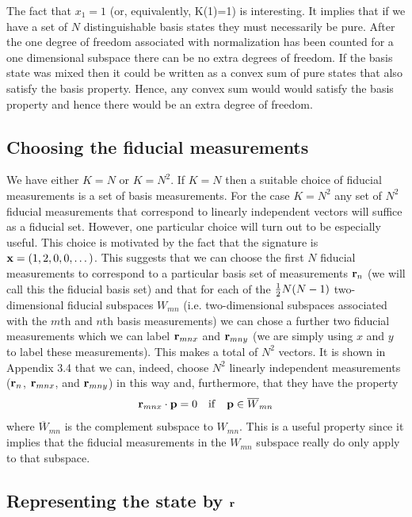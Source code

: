 \documentclass[12pt]{article}
\begin{document}
The fact that $x_1=1$ (or, equivalently, K(1)=1) is interesting.  It
implies that if we have a
set of $N$ distinguishable basis states they must necessarily be pure.
After the one degree of freedom associated with normalization has been
counted for a one
dimensional subspace there can be no extra degrees of freedom. If the
basis state was mixed then it could be written as a convex sum of pure
states that also satisfy the basis property. Hence, any convex sum would
would satisfy the basis property and hence there would be an extra
degree of freedom.

\subsection{Choosing the fiducial measurements}\label{choosing}

We have either $K=N$ or $K=N^2$. If $K=N$ then a suitable choice of
fiducial measurements is a set of basis measurements. For the case
$K=N^2$ any set of $N^2$ fiducial measurements that correspond to linearly
independent vectors will suffice as a fiducial set.  However, one
particular choice will turn out to be especially useful.  This choice
is motivated by the fact that the signature is
${\bf x}=(1,2,0,0,\dots)$.
This suggests that we can choose the first $N$ fiducial measurements to
correspond to a particular basis set of measurements ${\bf r}_n$ (we
will call this the fiducial basis set) and that for
each of the ${1\over2}N(N-1)$ two-dimensional fiducial subspaces
$W_{mn}$ (i.e.
two-dimensional subspaces associated with the $m$th and $n$th basis
measurements) we can chose a further two fiducial measurements which we can
label ${\bf r}_{mnx}$ and ${\bf r}_{mny}$ (we are simply using $x$ and
$y$ to label these measurements). This makes a total of $N^2$ vectors.
It is shown in Appendix 3.4 that we can, indeed, choose $N^2$ linearly
independent measurements
(${\bf r}_n$, ${\bf r}_{mnx}$, and ${\bf r}_{mny}$)
in this way and, furthermore, that they have the property
\begin{equation}\label{nooverlap}
{\bf r}_{mnx} \cdot {\bf p} = 0 ~~~{\rm if}~~~ {\bf p}\in \overline{W}_{mn}
\end{equation}
where $\overline{W}_{mn}$ is the complement subspace to $W_{mn}$.
This is a useful property since it implies that the fiducial measurements
in the $W_{mn}$ subspace really do only apply to that subspace.




\subsection{Representing the state by ${\bf r}$}
\end{document}
